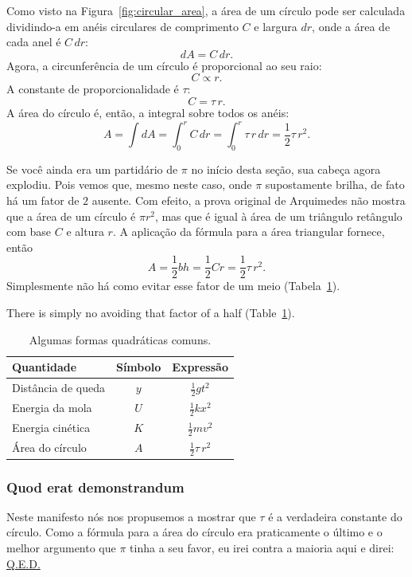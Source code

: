 {Como visto na Figura~\ref{fig:circular_area}, a área de um círculo pode ser calculada dividindo-a em anéis circulares de comprimento $C$ e largura $dr$, onde a área de cada anel é $C\,dr$:
\[ dA = C\,dr. \]
Agora, a circunferência de um círculo é proporcional ao seu raio:
\[ C \propto r. \]
A constante de proporcionalidade é $\tau$:
\[ C = \tau\,r. \]
A área do círculo é, então, a integral sobre todos os anéis:
\[ A = \int dA = \int_0^r C\,dr = \int_0^r \tau\,r\,dr = \textstyle{\frac{1}{2}} \tau\,r^2. \]

Se você ainda era um partidário de $\pi$ no início desta seção, sua cabeça agora explodiu. Pois vemos que, mesmo neste caso, onde $\pi$ supostamente brilha, de fato há um fator de $2$ ausente. Com efeito, a prova original de Arquimedes não mostra que a área de um círculo é $\pi r^2$, mas que é igual à área de um triângulo retângulo com base $C$ e altura $r$. A aplicação da fórmula para a área triangular fornece, então
\[
  A = \textstyle{\frac{1}{2}} bh = \textstyle{\frac{1}{2}}Cr = \textstyle{\frac{1}{2}}\tau\,r^2.
\]
Simplesmente não há como evitar esse fator de um meio (Tabela~\ref{table:quadratic_forms}).

There is simply no avoiding that factor of a half (Table~\ref{table:quadratic_forms}).

\begin{table}
\begin{center}
\begin{tabular}{lcc}
Quantidade & Símbolo & Expressão \\ \hline
Distância de queda & $y$ & $\textstyle{\frac{1}{2}}gt^2$ \smallskip \\
Energia da mola & $U$ & $\textstyle{\frac{1}{2}}kx^2$ \smallskip \\
Energia cinética & $K$ & $\textstyle{\frac{1}{2}}mv^2$ \smallskip \\
Área do círculo & $A$ & $\textstyle{\frac{1}{2}}\tau\,r^2$
\end{tabular}
\end{center}
\caption{Algumas formas quadráticas comuns.\label{table:quadratic_forms}}
\end{table}

    \subsubsection{Quod erat demonstrandum} %
    \label{sec:quod_erat_demonstrandum}

Neste manifesto nós nos propusemos a mostrar que $\tau$ é a verdadeira constante do círculo. Como a fórmula para a área do círculo era praticamente o último e o melhor argumento que $\pi$ tinha a seu favor, eu irei contra a maioria aqui e direi: \href{https://pt.wikipedia.org/wiki/Quod_erat_demonstrandum}{Q.E.D.}

}
